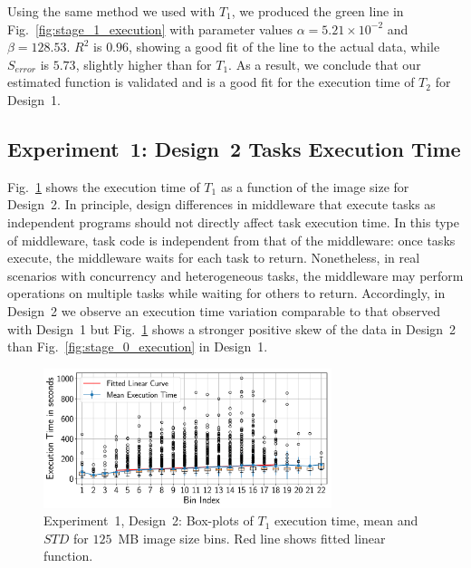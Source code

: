 Using the same method we used with $T_{1}$, we produced the green line in
Fig.~\ref{fig:stage_1_execution} with parameter values
$\alpha = 5.21 \times 10^{-2}$ and $\beta = 128.53$. $R^{2}$ is $0.96$,
showing a good fit of the line to the actual data, while $S_{error}$ is
$5.73$, slightly higher than for $T_{1}$. As a result, we conclude that our
estimated function is validated and is a good fit for the execution time of
$T_{2}$ for Design~1.

\subsection{Experiment~1: Design~2 Tasks Execution Time}

Fig.~\ref{fig:stage_1_execution_des2} shows the execution time of $T_{1}$ as a
function of the image size for Design~2. In principle, design differences in
middleware that execute tasks as independent programs should not directly
affect task execution time. In this type of middleware, task code is
independent from that of the middleware: once tasks execute, the middleware
waits for each task to return. Nonetheless, in real scenarios with concurrency
and heterogeneous tasks, the middleware may perform operations on multiple
tasks while waiting for others to return. Accordingly, in Design~2 we observe
an execution time variation comparable to that observed with Design~1 but
Fig.~\ref{fig:stage_1_execution_des2} shows a stronger positive skew of the
data in Design~2 than Fig.~\ref{fig:stage_0_execution} in Design~1.

\begin{figure}[t]
    \centering
    \includegraphics[width=0.75\textwidth]{figures/designs/stage_0_tx_box_des2.pdf}
    \caption{Experiment~1, Design~2: Box-plots of $T_{1}$ execution time, mean
    and $STD$ for $125$~MB image size bins. Red line shows fitted linear
    function.}
    \label{fig:stage_1_execution_des2}
\end{figure}

